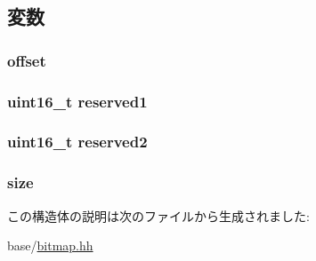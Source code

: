\subsection{変数}
\hypertarget{structBitmap_1_1Header_a894bdfa2d603d8343f8ef01dda6fcd23}{
\subsubsection[{offset}]{ {\bf offset}}}
\label{structBitmap_1_1Header_a894bdfa2d603d8343f8ef01dda6fcd23}
\hypertarget{structBitmap_1_1Header_a6b89b86dfe0266be2fc46cf46f6e7b72}{
\subsubsection[{reserved1}]{\setlength{\rightskip}{0pt plus 5cm}uint16\_\-t {\bf reserved1}}}
\label{structBitmap_1_1Header_a6b89b86dfe0266be2fc46cf46f6e7b72}
\hypertarget{structBitmap_1_1Header_a0fc429b055e74830a4583ec37f5c3846}{
\subsubsection[{reserved2}]{\setlength{\rightskip}{0pt plus 5cm}uint16\_\-t {\bf reserved2}}}
\label{structBitmap_1_1Header_a0fc429b055e74830a4583ec37f5c3846}
\hypertarget{structBitmap_1_1Header_ab2c6b258f02add8fdf4cfc7c371dd772}{
\subsubsection[{size}]{ {\bf size}}}
\label{structBitmap_1_1Header_ab2c6b258f02add8fdf4cfc7c371dd772}


この構造体の説明は次のファイルから生成されました:\begin{DoxyCompactItemize}
\item 
base/\hyperlink{bitmap_8hh}{bitmap.hh}\end{DoxyCompactItemize}
